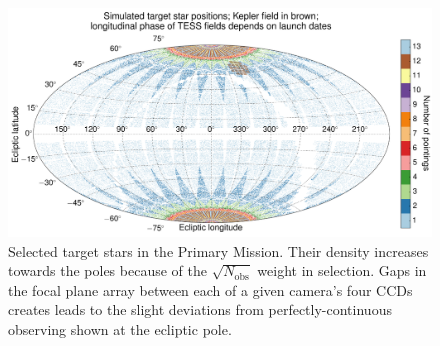 \begin{figure}[!tb] %
	\centering
	\includegraphics{figures/positions_pointings_kepler.pdf}
	\caption{Selected target stars in the Primary Mission. Their density 
	increases towards the poles because of the $\sqrt{N_\text{obs}}$ weight in 
	selection. Gaps in the focal plane array between each of a given camera's 
	four CCDs creates leads to the slight deviations from perfectly-continuous 
	observing shown at the ecliptic pole.}
	\label{fig:positions_pointings}
\end{figure}
